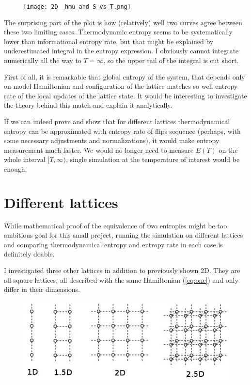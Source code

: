 \documentclass{llncs}
\begin{document}
\begin{figure}[h!]
\texttt{[image: 2D\_\_hmu\_and\_S\_vs\_T.png]}
\centering
\end{figure}

The surprising part of the plot is how (relatively) well two curves agree between these two limiting cases. Thermodynamic entropy seems to be systematically lower than informational entropy rate, but that might be explained by underestimated integral in the entropy expression. I obviously cannot integrate numerically all the way to $T = \infty$, so the upper tail of the integral is cut short.

First of all, it is remarkable that global entropy of the system, that depends only on model Hamiltonian and configuration of the lattice matches so well entropy rate of the local updates of the lattice state. It would be interesting to investigate the theory behind this match and explain it analytically.

If we can indeed prove and show that for different lattices thermodynamical entropy can be approximated with entropy rate of flips sequence (perhaps, with some necessary adjustments and normalizations), it would make entropy measurement much faster. We would no longer need to measure $E(T)$ on the whole interval $[T, \infty)$, single simulation at the temperature of interest would be enough.


%
\section{Different lattices}
%
While mathematical proof of the equivalence of two entropies might be too ambitious goal for this small project, running the simulation on different lattices and comparing thermodynamical entropy and entropy rate in each case is definitely doable.

I investigated three other lattices in addition to previously shown 2D. They are all square lattices, all described with the same Hamiltonian (\ref{eq:one}) and only differ in their dimensions.

\begin{figure}[h!]
\includegraphics[width=0.8\linewidth]{lattices.jpg}
\centering
\end{figure}
\end{document}
